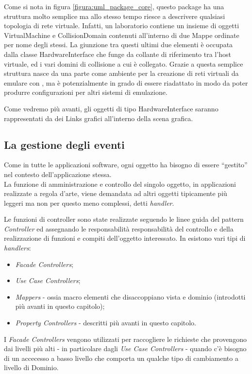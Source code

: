 Come si nota in figura \ref{figura:uml_package_core}, questo package ha una struttura molto semplice ma allo stesso tempo riesce a descrivere qualsiasi topologia di rete virtuale. Infatti, un laboratorio contiene un insieme di oggetti VirtualMachine e CollisionDomain contenuti all'interno di due Mappe ordinate per nome degli stessi. La giunzione tra questi ultimi due elementi è occupata dalla classe HardwareInterface che funge da collante di riferimento tra l'host virtuale, ed i vari domini di collisione a cui è collegato.
Grazie a questa semplice struttura \visualnetkit{} nasce da una parte come ambiente per la creazione di reti virtuali da emulare con \netkit{}, ma è potenzialmente in grado di essere riadattato in modo da poter produrre configurazioni per altri sistemi di emulazione.

Come vedremo più avanti, gli oggetti di tipo HardwareInterface saranno rappresentati da dei Links grafici all'interno della scena grafica.

\subsection{La gestione degli eventi}
Come in tutte le applicazioni software, ogni oggetto ha bisogno di essere ``gestito'' nel contesto dell'applicazione stessa.\\
La funzione di amministrazione e controllo del singolo oggetto, in applicazioni realizzate a regola d'arte, viene demandata ad altri oggetti tipicamente più leggeri ma non per questo meno complessi, detti \emph{handler}.

Le funzioni di controller sono state realizzate seguendo le linee guida del pattern \emph{Controller}\cite{AUPL04} ed assegnando le responsabilità responsabilità del controllo e della realizzazione di funzioni e compiti dell'oggetto interessato. In \visualnetkit{} esistono vari tipi di \emph{handlers}:
\begin{itemize}
\item \emph{Facade Controllers};
\item \emph{Use Case Controllers};
\item \emph{Mappers} - ossia macro elementi che disaccoppiano vista e dominio (introdotti più avanti in questo capitolo);
\item \emph{Property Controllers} - descritti più avanti in questo capitolo.
\end{itemize}

I \emph{Facade Controllers} vengono utilizzati per raccogliere le richieste che provengono dai livelli più alti - in particolare dagli \emph{Use Case Controllers} - quando c'è bisogno di un accecesso a basso livello che comporta un qualche tipo di cambiamento a livello di Dominio.

